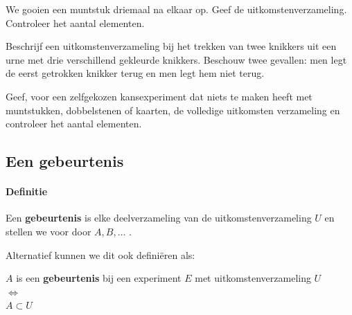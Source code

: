 \documentclass[12pt,twoside]{article}
\begin{document}
\begin{oefening}
We gooien een muntstuk driemaal na elkaar op. Geef de uitkomstenverzameling. Controleer het aantal elementen.
\end{oefening}

\begin{oefening}
Beschrijf een uitkomstenverzameling bij het trekken van twee knikkers uit een urne met drie verschillend gekleurde knikkers. Beschouw twee gevallen: men legt de eerst getrokken knikker terug en men legt hem niet terug.
\end{oefening}

\begin{oefening}
Geef, voor een zelfgekozen kansexperiment dat niets te maken heeft met muntstukken, dobbelstenen of kaarten, de volledige uitkomsten verzameling en controleer het aantal elementen.
\end{oefening}

\subsection{Een gebeurtenis}

\paragraph*{Definitie} Een {\bf gebeurtenis} is elke deelverzameling van de uitkomstenverzameling $U$ en stellen we voor door $A, B, \ldots$ .

Alternatief kunnen we dit ook definiëren als:\\
\begin{mdframed}
\begin{center}
$A$ is een {\bf gebeurtenis} bij een experiment $E$ met uitkomstenverzameling $U$\\
$\Leftrightarrow$\\
$A\subset U$
\end{center}
\end{mdframed}
\end{document}

